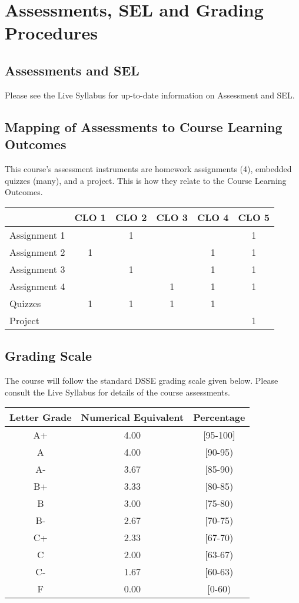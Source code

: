 \documentclass[a4paper]{article}
\begin{document}
\section{Assessments, SEL and Grading Procedures}

\subsection{Assessments and SEL}

Please see the Live Syllabus for up-to-date information on Assessment and SEL.

\subsection{Mapping of Assessments to Course Learning Outcomes}

This course’s assessment instruments are homework assignments (4), embedded quizzes (many), and a project. This is how they relate to the Course Learning Outcomes.
\smallskip

\noindent
\begin{tabularx}{1.0\linewidth}{|l||*5{C|}}
  \hline
  &CLO 1& CLO 2& CLO 3& CLO 4& CLO 5\\  \hline\hline
  Assignment 1 & & 1 & & & 1 \\\hline
  Assignment 2 & 1 &  & & 1 & 1 \\\hline
  Assignment 3 & & 1 & & 1 & 1 \\\hline
  Assignment 4 & & & 1 & 1 & 1 \\\hline
  Quizzes & 1 & 1 & 1 & 1 & \\\hline
  Project & & & & & 1 \\\hline
\end{tabularx}

\subsection{Grading Scale}

The course will follow the standard DSSE grading scale given below. Please consult the Live Syllabus for details of the course assessments.

\begin{center}
  \begin{tabular}{|*3{c|}}
\hline
Letter Grade & Numerical Equivalent & Percentage\\\hline\hline
A+ & 4.00 & [95-100] \\\hline
A & 4.00 & [90-95) \\\hline
A- & 3.67 & [85-90) \\\hline
B+ & 3.33 & [80-85) \\\hline
B & 3.00 & [75-80) \\\hline
B- & 2.67 & [70-75) \\\hline
C+ & 2.33 & [67-70) \\\hline
C & 2.00 & [63-67) \\\hline
C- & 1.67 & [60-63) \\\hline
F & 0.00 & [0-60) \\\hline
  \end{tabular}
\end{center}
\end{document}
